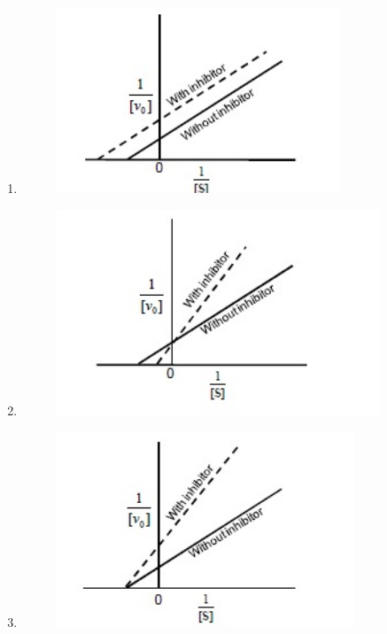 \documentclass[journal,12pt,onecolumn]{IEEEtran}
\begin{document}
\begin{enumerate}[label=\textbf{Q.\arabic*}]
    \begin{multicols}{2}
        \begin{enumerate}
     \item \begin{figure}[H]
        \centering
        \includegraphics[width=0.8\columnwidth]{fig 2.png}
        \caption{}
        \label{fig:q31}
    \end{figure}
            \item \begin{figure}[H]
        \centering
        \includegraphics[width=0.8\columnwidth]{fig 3.png}
        \caption{}
        \label{fig:q31}
    \end{figure}
            \item \begin{figure}[H]
        \centering
        \includegraphics[width=0.8\columnwidth]{fig 4.png}

\end{figure}
\end{enumerate}
\end{multicols}
\end{enumerate}
\end{document}
